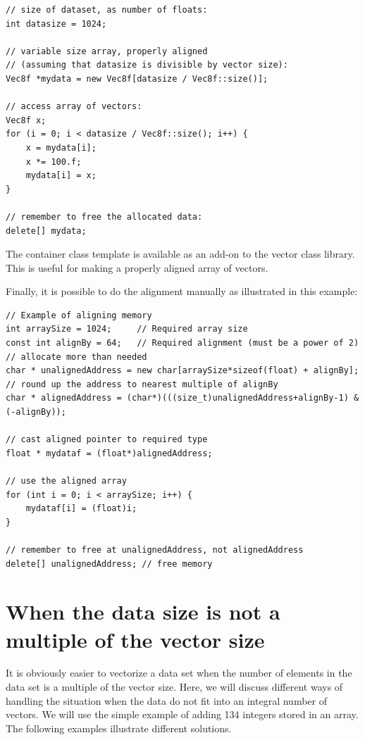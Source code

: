 \documentclass[vcl_manual.tex]{subfiles}
\begin{document}
\begin{lstlisting}[frame=none]
// size of dataset, as number of floats:
int datasize = 1024;

// variable size array, properly aligned
// (assuming that datasize is divisible by vector size):
Vec8f *mydata = new Vec8f[datasize / Vec8f::size()];

// access array of vectors:
Vec8f x;
for (i = 0; i < datasize / Vec8f::size(); i++) {
    x = mydata[i];
    x *= 100.f;
    mydata[i] = x;
}

// remember to free the allocated data:
delete[] mydata;
\end{lstlisting}

The container class template  is available as an add-on to the vector class library. This is useful for making a properly aligned array of vectors.

Finally, it is possible to do the alignment manually as illustrated in this example:

\begin{lstlisting}[frame=none]
// Example of aligning memory
int arraySize = 1024;     // Required array size
const int alignBy = 64;   // Required alignment (must be a power of 2)
// allocate more than needed
char * unalignedAddress = new char[arraySize*sizeof(float) + alignBy];
// round up the address to nearest multiple of alignBy
char * alignedAddress = (char*)(((size_t)unalignedAddress+alignBy-1) & (-alignBy));

// cast aligned pointer to required type
float * mydataf = (float*)alignedAddress;

// use the aligned array
for (int i = 0; i < arraySize; i++) {
    mydataf[i] = (float)i;
}

// remember to free at unalignedAddress, not alignedAddress
delete[] unalignedAddress; // free memory

\end{lstlisting}



\section{When the data size is not a multiple of the vector size}\label{NotAMultipleOfVectorSize}

It is obviously easier to vectorize a data set when the number of elements in the data set is a multiple of the vector size. Here, we will discuss different ways of handling the situation when the data do not fit into an integral number of vectors. We will use the simple example of adding 134 integers stored in an array. The following examples illustrate different solutions.
\end{document}
